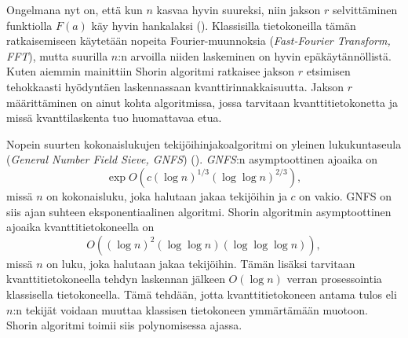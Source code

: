 \iffalse
Algoritmi jolla Shorin algoritmi jakaa luvun $n$ on seuraavanlainen (\cite{doi:10.1080/23742917.2016.1226650}):
\begin{enumerate}

    \item Valitaan satunnainen luku väliltä $x \in \{2, \ldots, n-1\}$
    
    \item Tutkitaan ovatko $x$ ja $n$ suhteellisia alkulukuja\footnote{ks. kappale 2.3} keskenään eli jos $syt(x,n) = 1$, mennään kohtaan 3. Muuten olemme löytäneet toisen tekijöistä.
    
    \item Etsitään funktion $f(x) = x^{a} \mod n$ jakso $r$, missä $a = \mathbb{N}$. Jakson $r$ löytäminen toimii siten, että yhtälöä $f(x) = x^{a} \mod n$ kokeillaan kasvavilla $a$:n arvoilla kunnes löydetään $a$:n arvo jolla yhtälön ratkaisut alkavat toistua.
    
    \item Jos jakso $r$ oli parillinen, niin jatketaan eteenpäin kohtaan 4. Muuten palataan kohtaan 1. ja valitaan uusi satunnainen luku.
    
    \item Lasketaan \[d = max \{syt(x^{r/2}-1,n), syt(x^{r/2}+1,n) \} \]
    
    \item Jos $d \neq 1$, olemme löytäneet tekijän jomman kumman tekijän. Muuten palataan kohtaan 1.
\end{enumerate}
\fi

Ongelmana nyt on, että kun $n$ kasvaa hyvin suureksi, niin jakson $r$ selvittäminen funktiolla $F(a)$ käy hyvin hankalaksi (\cite{doi:10.1080/23742917.2016.1226650}). Klassisilla tietokoneilla tämän ratkaisemiseen käytetään nopeita Fourier-muunnoksia (\emph{Fast-Fourier Transform, FFT}), mutta suurilla $n$:n arvoilla niiden laskeminen on hyvin epäkäytännöllistä. Kuten aiemmin mainittiin Shorin algoritmi ratkaisee jakson $r$ etsimisen tehokkaasti hyödyntäen laskennassaan kvanttirinnakkaisuutta. Jakson $r$ määrittäminen on ainut kohta algoritmissa, jossa tarvitaan kvanttitietokonetta ja missä kvanttilaskenta tuo huomattavaa etua.

Nopein suurten kokonaislukujen tekijöihinjakoalgoritmi on yleinen lukukuntaseula (\emph{General Number Field Sieve, GNFS}) (\cite{doi:10.1137/S0036144598347011}). \emph{GNFS}:n asymptoottinen ajoaika on \[\exp  O(c(\log n)^{1/3} (\log \log n)^{2/3}),\] missä $n$ on kokonaisluku, joka halutaan jakaa tekijöihin ja $c$ on vakio. GNFS on siis ajan suhteen eksponentiaalinen algoritmi. Shorin algoritmin asymptoottinen ajoaika kvanttitietokoneella on \[O((\log n)^{2}(\log \log n) (\log \log \log n)),\] missä $n$ on luku, joka halutaan jakaa tekijöihin. Tämän lisäksi tarvitaan kvanttitietokoneella tehdyn laskennan jälkeen $O(\log n)$ verran prosessointia klassisella tietokoneella. Tämä tehdään, jotta kvanttitietokoneen antama tulos eli $n$:n tekijät voidaan muuttaa klassisen tietokoneen ymmärtämään muotoon. Shorin algoritmi toimii siis polynomisessa ajassa.

